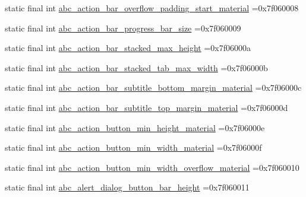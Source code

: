 \begin{DoxyCompactItemize}
\item 
static final int \mbox{\hyperlink{classbr_1_1unb_1_1cic_1_1mp_1_1marketmaster_1_1R_1_1dimen_a9c74ba94fe71a964ca1b0b359041b1b9}{abc\+\_\+action\+\_\+bar\+\_\+overflow\+\_\+padding\+\_\+start\+\_\+material}} =0x7f060008
\item 
static final int \mbox{\hyperlink{classbr_1_1unb_1_1cic_1_1mp_1_1marketmaster_1_1R_1_1dimen_afd42a27998aaf675cdb8ce6a3fd70cd0}{abc\+\_\+action\+\_\+bar\+\_\+progress\+\_\+bar\+\_\+size}} =0x7f060009
\item 
static final int \mbox{\hyperlink{classbr_1_1unb_1_1cic_1_1mp_1_1marketmaster_1_1R_1_1dimen_a29241eb41d8a122c8c378abb7de8529b}{abc\+\_\+action\+\_\+bar\+\_\+stacked\+\_\+max\+\_\+height}} =0x7f06000a
\item 
static final int \mbox{\hyperlink{classbr_1_1unb_1_1cic_1_1mp_1_1marketmaster_1_1R_1_1dimen_a4dd9b7b35079b9ef1e40c69c5b51c79a}{abc\+\_\+action\+\_\+bar\+\_\+stacked\+\_\+tab\+\_\+max\+\_\+width}} =0x7f06000b
\item 
static final int \mbox{\hyperlink{classbr_1_1unb_1_1cic_1_1mp_1_1marketmaster_1_1R_1_1dimen_a04f6a5f7650510e05aaf044611b8380c}{abc\+\_\+action\+\_\+bar\+\_\+subtitle\+\_\+bottom\+\_\+margin\+\_\+material}} =0x7f06000c
\item 
static final int \mbox{\hyperlink{classbr_1_1unb_1_1cic_1_1mp_1_1marketmaster_1_1R_1_1dimen_a92ee5205320a632fd87a4cfa8fd55009}{abc\+\_\+action\+\_\+bar\+\_\+subtitle\+\_\+top\+\_\+margin\+\_\+material}} =0x7f06000d
\item 
static final int \mbox{\hyperlink{classbr_1_1unb_1_1cic_1_1mp_1_1marketmaster_1_1R_1_1dimen_ad154f97b29ebf92073b863d71a962911}{abc\+\_\+action\+\_\+button\+\_\+min\+\_\+height\+\_\+material}} =0x7f06000e
\item 
static final int \mbox{\hyperlink{classbr_1_1unb_1_1cic_1_1mp_1_1marketmaster_1_1R_1_1dimen_a9760c5868d8c88d87ddadf73e1388fdc}{abc\+\_\+action\+\_\+button\+\_\+min\+\_\+width\+\_\+material}} =0x7f06000f
\item 
static final int \mbox{\hyperlink{classbr_1_1unb_1_1cic_1_1mp_1_1marketmaster_1_1R_1_1dimen_a9e0a74b81263d204e419e96af01a8349}{abc\+\_\+action\+\_\+button\+\_\+min\+\_\+width\+\_\+overflow\+\_\+material}} =0x7f060010
\item 
static final int \mbox{\hyperlink{classbr_1_1unb_1_1cic_1_1mp_1_1marketmaster_1_1R_1_1dimen_a14c5c0229c8c31e456e73a7a668d25f9}{abc\+\_\+alert\+\_\+dialog\+\_\+button\+\_\+bar\+\_\+height}} =0x7f060011
\item 

\end{DoxyCompactItemize}
